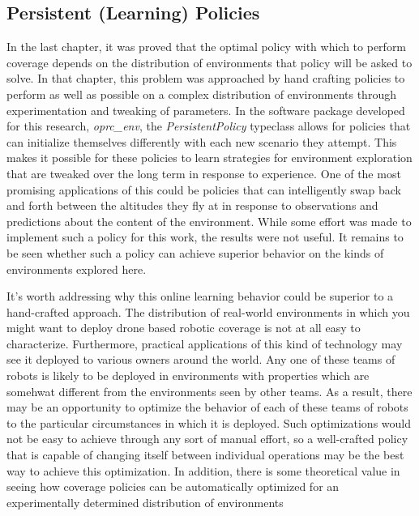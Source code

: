 \subsection{Persistent (Learning) Policies}

In the last chapter, it was proved that the optimal policy with which to perform coverage depends on the distribution of environments that policy will be asked to solve. In that chapter, this problem was approached by hand crafting policies to perform as well as possible on a complex distribution of environments through experimentation and tweaking of parameters. In the software package developed for this research, \textit{oprc\_env}, the \textit{PersistentPolicy} typeclass allows for policies that can initialize themselves differently with each new scenario they attempt. This makes it possible for these policies to learn strategies for environment exploration that are tweaked over the long term in response to experience. One of the most promising applications of this could be policies that can intelligently swap back and forth between the altitudes they fly at in response to observations and predictions about the content of the environment. While some effort was made to implement such a policy for this work, the results were not useful. It remains to be seen whether such a policy can achieve superior behavior on the kinds of environments explored here.


It's worth addressing why this online learning behavior could be superior to a hand-crafted approach. The distribution of real-world environments in which you might want to deploy drone based robotic coverage is not at all easy to characterize. Furthermore, practical applications of this kind of  technology may see it deployed to various owners around the world. Any one of these teams of robots is likely to be deployed in environments with properties which are somehwat different from the environments seen by other teams. As a result, there may be an opportunity to optimize the behavior of each of these teams of robots to the particular circumstances in which it is deployed. Such optimizations would not be easy to achieve through any sort of manual effort, so a well-crafted policy that is capable of changing itself between individual operations may be the best way to achieve this optimization. In addition, there is some theoretical value in seeing how coverage policies can be automatically optimized for an experimentally determined distribution of environments


